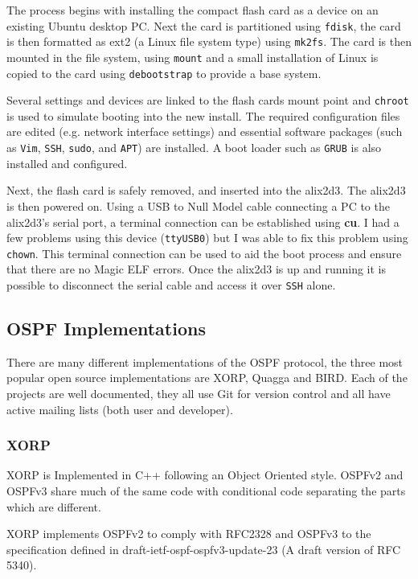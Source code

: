 \documentclass[12pt]{report}
\begin{document}
The process begins with installing the compact flash card as a device on an
existing Ubuntu desktop PC. Next the card is partitioned using \texttt{fdisk},
the card is then formatted as ext2 (a Linux file system type) using
\texttt{mk2fs}. The card is then mounted in the file system, using
\texttt{mount} and a small installation of Linux is copied to the card using
\texttt{debootstrap} to provide a base system.  

Several settings and devices are linked to the flash cards mount point and
\texttt{chroot} is used to simulate booting into the new install. The required
configuration files are edited (e.g. network interface settings) and essential
software packages (such as \texttt{Vim}, \texttt{SSH}, \texttt{sudo}, and
\texttt{APT}) are installed. A boot loader such as \texttt{GRUB} is also
installed and configured. 

Next, the flash card is safely removed, and  inserted into the alix2d3. The
alix2d3 is then powered on. Using a USB to Null Model cable connecting a PC to
the alix2d3's serial port, a terminal connection can be established using {\bf
cu}. I had a few problems using this device (\texttt{ttyUSB0}) but I was able to
fix this problem using \texttt{chown}. This terminal connection can be used to
aid the boot process and ensure that there are no Magic ELF errors. Once the
alix2d3 is up and running it is possible to disconnect the serial cable and
access it over \texttt{SSH} alone. 

\subsection{OSPF Implementations}
There are many different implementations of the OSPF protocol, the three most
popular open source implementations are XORP, Quagga and BIRD. Each of the
projects are well documented, they all use Git for version control and all have
active mailing lists (both user and developer).

\subsubsection{XORP}
XORP is Implemented in C++ following an Object Oriented style. OSPFv2 and OSPFv3
share much of the same code with conditional code separating the parts which are
different.

XORP implements OSPFv2 to comply with RFC2328 and OSPFv3 to the specification
defined in draft-ietf-ospf-ospfv3-update-23 (A draft version of RFC 5340).
\end{document}
